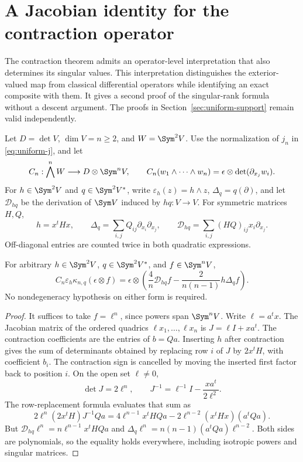 \section{A Jacobian identity for the contraction operator}
\label{sec:jacobian-casimir}

The contraction theorem admits an operator-level interpretation that
also determines its singular values. This interpretation distinguishes
the exterior-valued map from classical differential operators while
identifying an exact composite with them. It gives a second proof of
the singular-rank formula without a descent argument. The proofs in
Section~\ref{sec:uniform-support} remain valid independently.

Let \(D=\det V\), \(\dim V=n\ge2\), and \(W=\Sym^2V\).
Use the normalization of \(j_n\) in \eqref{eq:uniform-j}, and let
\[
 C_n:\bigwedge^n W\longrightarrow D\otimes\Sym^nV,
 \qquad C_n(w_1\wedge\cdots\wedge w_n)
 =\epsilon\otimes\det(\partial_{x_j}w_i).
\]
For \(h\in\Sym^2V\) and \(q\in\Sym^2V^*\), write
\(\varepsilon_h(z)=h\wedge z\), \(\Delta_q=q(\partial)\),
and let \(\mathcal D_{hq}\) be the derivation of \(\Sym V\)
induced by \(hq:V\to V\). For symmetric matrices \(H,Q\),
\[
 h=x^tHx,\qquad \Delta_q=\sum_{i,j}Q_{ij}\partial_{x_i}\partial_{x_j},
 \qquad\mathcal D_{hq}=\sum_{i,j}(HQ)_{ij}x_i\partial_{x_j}.
\]
Off-diagonal entries are counted twice in both quadratic expressions.

\begin{theorem}
\label{thm:mixed-jacobian-contraction}
For arbitrary \(h\in\Sym^2V\), \(q\in\Sym^2V^*\), and
\(f\in\Sym^nV\),
\begin{equation}\label{eq:mixed-jacobian-contraction}
 C_n\varepsilon_h\kappa_{n,q}(\epsilon\otimes f)
 =\epsilon\otimes\left(\frac4n\mathcal D_{hq}f
       -\frac{2}{n(n-1)}h\Delta_q f\right).
\end{equation}
No nondegeneracy hypothesis on either form is required.
\end{theorem}
\begin{proof}
It suffices to take \(f=\ell^n\), since powers span \(\Sym^nV\).
Write \(\ell=a^tx\). The Jacobian matrix of the ordered quadrics
\(\ell x_1,\ldots,\ell x_n\) is \(J=\ell I+xa^t\).
The contraction coefficients are the entries of \(b=Qa\).
Inserting \(h\) after contraction gives the sum of determinants
obtained by replacing row \(i\) of \(J\) by \(2x^tH\),
with coefficient \(b_i\). The contraction sign is cancelled by
moving the inserted first factor back to position \(i\).
On the open set \(\ell\ne0\),
\[
 \det J=2\ell^n,\qquad
 J^{-1}=\ell^{-1}I-\frac{xa^t}{2\ell^2}.
\]
The row-replacement formula evaluates that sum as
\[
 2\ell^n(2x^tH)J^{-1}Qa
 =4\ell^{n-1}x^tHQa-2\ell^{n-2}(x^tHx)(a^tQa).
\]
But \(\mathcal D_{hq}\ell^n=n\ell^{n-1}x^tHQa\) and
\(\Delta_q\ell^n=n(n-1)(a^tQa)\ell^{n-2}\).
Both sides are polynomials, so the equality holds everywhere,
including isotropic powers and singular matrices.
\end{proof}

